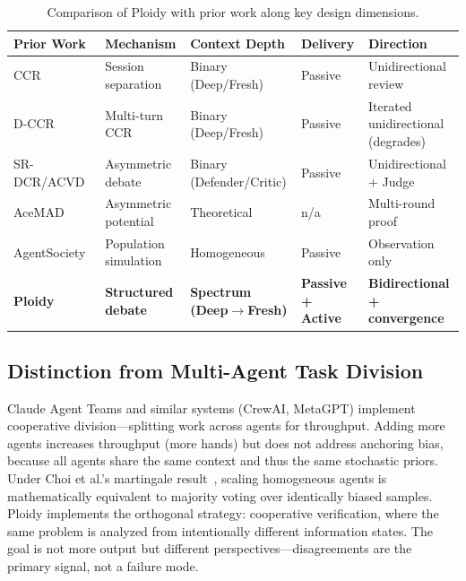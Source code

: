 \documentclass[11pt]{article}
\begin{document}
\begin{table}[t]
\centering
\caption{Comparison of Ploidy with prior work along key design dimensions.}
\label{tab:prior-work}
\footnotesize
\setlength{\tabcolsep}{4pt}
\begin{tabular}{@{}p{3.2cm}p{2.4cm}p{3cm}p{2.2cm}p{3cm}@{}}
\toprule
\textbf{Prior Work} & \textbf{Mechanism} & \textbf{Context Depth} & \textbf{Delivery} & \textbf{Direction} \\
\midrule
CCR~\citep{song2026ccr} & Session separation & Binary (Deep/Fresh) & Passive & Unidirectional review \\[3pt]
D-CCR~\citep{song2026dccr} & Multi-turn CCR & Binary (Deep/Fresh) & Passive & Iterated unidirectional (degrades) \\[3pt]
SR-DCR/ACVD~\citep{srdcr2025} & Asymmetric debate & Binary (Defender/Critic) & Passive & Unidirectional + Judge \\[3pt]
AceMAD~\citep{liu2026acemad} & Asymmetric potential & Theoretical & n/a & Multi-round proof \\[3pt]
AgentSociety~\citep{pang2025agentsociety} & Population simulation & Homogeneous & Passive & Observation only \\[3pt]
\textbf{Ploidy} & \textbf{Structured debate} & \textbf{Spectrum (Deep$\to$Fresh)} & \textbf{Passive + Active} & \textbf{Bidirectional + convergence} \\
\bottomrule
\end{tabular}
\end{table}

\subsection{Distinction from Multi-Agent Task Division}
\label{sec:distinction}

Claude Agent Teams and similar systems (CrewAI, MetaGPT) implement cooperative division---splitting work across agents for throughput. Adding more agents increases throughput (more hands) but does not address anchoring bias, because all agents share the same context and thus the same stochastic priors. Under Choi et al.'s martingale result~\citep{choi2025debate}, scaling homogeneous agents is mathematically equivalent to majority voting over identically biased samples. Ploidy implements the orthogonal strategy: cooperative verification, where the same problem is analyzed from intentionally different information states. The goal is not more output but different perspectives---disagreements are the primary signal, not a failure mode.
\end{document}

